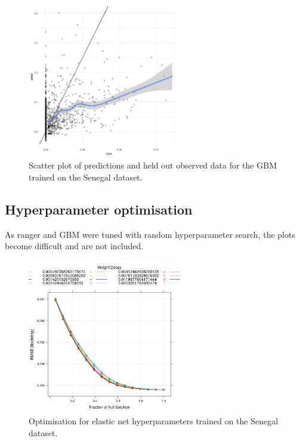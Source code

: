 \documentclass[review]{elsarticle}
\begin{document}
\begin{figure}[h!]
  \centering
  \includegraphics[width=0.6\textwidth]{figs/SI/xgboost_obspred_sen.png}
\caption{
  Scatter plot of predictions and held out observed data for the GBM trained on the Senegal dataset.
}

\end{figure}


\clearpage
\subsection{Hyperparameter optimisation}

As ranger and GBM were tuned with random hyperparameter search, the plots become difficult and are not included.


\begin{figure}[h!]
  \centering
  \includegraphics[width=0.6\textwidth]{figs/SI/enetopt_sen.png}
\caption{
  Optimisation for elastic net hyperparameters trained on the Senegal dataset.
}
\end{figure}
\end{document}
